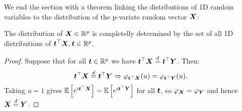 We end the section with a theorem linking the distributions of 1D random variables to the distribution of the p-variate random vector $\X$:
\begin{theorem}
    The distribution of $\X\in\R^p$ is completelly determined by the set of all 1D distributions of $\mt^\top\X, \mt\in\R^p$.
\end{theorem}
\begin{proof}
    Suppose that for all $\mt\in\R^p$ we have $\mt^\top \X \overset{d}{=} \mt^\top \Y$. Then:
    $$
        \mt^\top \X \overset{d}{=} \mt^\top \Y \Rightarrow \phi_{\mt^\top\X}(u) = \phi_{\mt^\top\Y}(u).
    $$
    Taking $u=1$ gives $\ev{e^{i\mt^\top\X}} = \ev{e^{i\mt^\top\Y}}$ for all $\mt$, so $\phi_{\X}=\phi_{\Y}$ and hence $\X \overset{d}{=}  \Y$.
\end{proof}